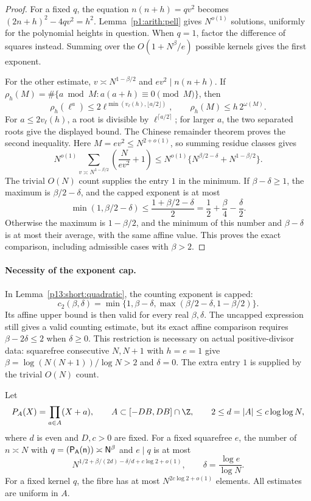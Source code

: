 \begin{proof}
For a fixed \(q\), the equation \(n(n+h)=qv^2\) becomes
\((2n+h)^2-4qv^2=h^2\). Lemma~\ref{p1:arith:pell}
gives \(N^{o(1)}\) solutions, uniformly for the polynomial
heights in question. When \(q=1\), factor the difference of
squares instead. Summing over the \(O(1+N^\beta/e)\)
possible kernels gives the first exponent.

For the other estimate, \(v\asymp N^{1-\beta/2}\) and
\(ev^2\mid n(n+h)\). If
\(\rho_h(M)=\#\{a\bmod M:a(a+h)\equiv0\pmod M\}\), then
\[
 \rho_h(\ell^a)
 \le2\ell^{\min(v_\ell(h),\lfloor a/2\rfloor)},\qquad
 \rho_h(M)\le h\,2^{\omega(M)}.
\]
For \(a\le2v_\ell(h)\), a root is divisible by
\(\ell^{\lceil a/2\rceil}\); for larger \(a\), the two
separated roots give the displayed bound. The Chinese
remainder theorem proves the second inequality. Here
\(M=ev^2\le N^{2+o(1)}\), so summing residue classes gives
\[
 N^{o(1)}
 \sum_{v\asymp N^{1-\beta/2}}\left(\frac{N}{ev^2}+1\right)
 \le N^{o(1)}
       \{N^{\beta/2-\delta}+N^{1-\beta/2}\}.
\]
The trivial \(O(N)\) count supplies the entry \(1\) in the
minimum.  If \(\beta-\delta\ge1\), the maximum is
\(\beta/2-\delta\), and the capped exponent is at most
\[
 \min(1,\beta/2-\delta)
 \le \frac{1+\beta/2-\delta}{2}
 =\frac12+\frac\beta4-\frac\delta2.
\]
Otherwise the maximum is \(1-\beta/2\), and the minimum of this
number and \(\beta-\delta\) is at most their average, with the
same affine value.  This proves the exact comparison, including
admissible cases with \(\beta>2\).
\end{proof}

\paragraph{Necessity of the exponent cap.}
In Lemma~\ref{p13:short:quadratic}, the counting exponent is capped:
\[
 c_2(\beta,\delta)
   =\min\{1,\beta-\delta,\max(\beta/2-\delta,1-\beta/2)\}.
\]
Its affine upper bound is then valid for every real $\beta,\delta$.
The uncapped expression still gives a valid counting estimate, but
its exact affine comparison requires $\beta-2\delta\le2$ when
$\delta\ge0$. This restriction is necessary on actual positive-divisor
data: squarefree consecutive $N,N+1$ with $h=e=1$ give
$\beta=\log(N(N+1))/\log N>2$ and $\delta=0$.
The extra entry $1$ is supplied by the trivial $O(N)$ count.


\begin{lemma}
\label{p13:short:split}
Let
\[
 P_A(X)=\prod_{a\in A}(X+a),\qquad
 A\subset[-DB,DB]\cap\Z,\qquad
 2\le d=|A|\le c\log\log N,
\]
where \(d\) is even and \(D,c>0\) are fixed.
For a fixed squarefree \(e\), the number of \(n\asymp N\)
with \(q=\sf(P_A(n))\asymp N^\beta\) and \(e\mid q\) is at most
\begin{equation}
 N^{1/2+\beta/(2d)-\delta/d+c\log2+o(1)},
 \qquad \delta=\frac{\log e}{\log N}.
 \label{p13:short:split-count}
\end{equation}
For a fixed kernel \(q\), the fibre has at most
\(N^{2c\log2+o(1)}\) elements. All estimates are uniform in \(A\).
\end{lemma}

